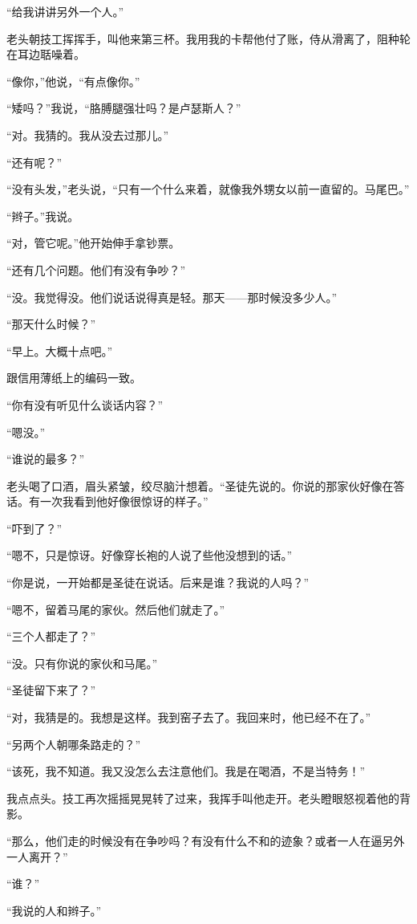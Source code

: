 \documentclass[AutoFakeBold=true]{book}
\begin{document}
``给我讲讲另外一个人。''

老头朝技工挥挥手，叫他来第三杯。我用我的卡帮他付了账，侍从滑离了，阻种轮在耳边聒噪着。

``像你，''他说，``有点像你。''

``矮吗？''我说，``胳膊腿强壮吗？是卢瑟斯人？''

``对。我猜的。我从没去过那儿。''

``还有呢？''

``没有头发，''老头说，``只有一个什么来着，就像我外甥女以前一直留的。马尾巴。''

``辫子。''我说。

``对，管它呢。''他开始伸手拿钞票。

``还有几个问题。他们有没有争吵？''

``没。我觉得没。他们说话说得真是轻。那天——那时候没多少人。''

``那天什么时候？''

``早上。大概十点吧。''

跟信用薄纸上的编码一致。

``你有没有听见什么谈话内容？''

``嗯没。''

``谁说的最多？''

老头喝了口酒，眉头紧皱，绞尽脑汁想着。``圣徒先说的。你说的那家伙好像在答话。有一次我看到他好像很惊讶的样子。''

``吓到了？''

``嗯不，只是惊讶。好像穿长袍的人说了些他没想到的话。''

``你是说，一开始都是圣徒在说话。后来是谁？我说的人吗？''

``嗯不，留着马尾的家伙。然后他们就走了。''

``三个人都走了？''

``没。只有你说的家伙和马尾。''

``圣徒留下来了？''

``对，我猜是的。我想是这样。我到窑子去了。我回来时，他已经不在了。''

``另两个人朝哪条路走的？''

``该死，我不知道。我又没怎么去注意他们。我是在喝酒，不是当特务！''

我点点头。技工再次摇摇晃晃转了过来，我挥手叫他走开。老头瞪眼怒视着他的背影。

``那么，他们走的时候没有在争吵吗？有没有什么不和的迹象？或者一人在逼另外一人离开？''

``谁？''

``我说的人和辫子。''
\end{document}
